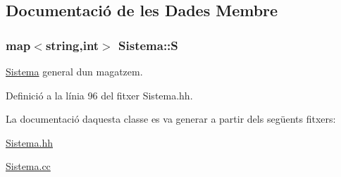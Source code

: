 \subsection{Documentació de les Dades Membre}
\subsubsection[{\texorpdfstring{S}{S}}]{\setlength{\rightskip}{0pt plus 5cm}map$<$string,int$>$ Sistema\+::S\hspace{0.3cm}{\ttfamily [private]}}\hypertarget{class_sistema_ad661bd526f622b1a3c4a0688b010eea2}{}\label{class_sistema_ad661bd526f622b1a3c4a0688b010eea2}


\hyperlink{class_sistema}{Sistema} general d\textquotesingle{}un magatzem. 



Definició a la línia 96 del fitxer Sistema.\+hh.



La documentació d\textquotesingle{}aquesta classe es va generar a partir dels següents fitxers\+:\begin{DoxyCompactItemize}
\item 
\hyperlink{_sistema_8hh}{Sistema.\+hh}\item 
\hyperlink{_sistema_8cc}{Sistema.\+cc}\end{DoxyCompactItemize}
